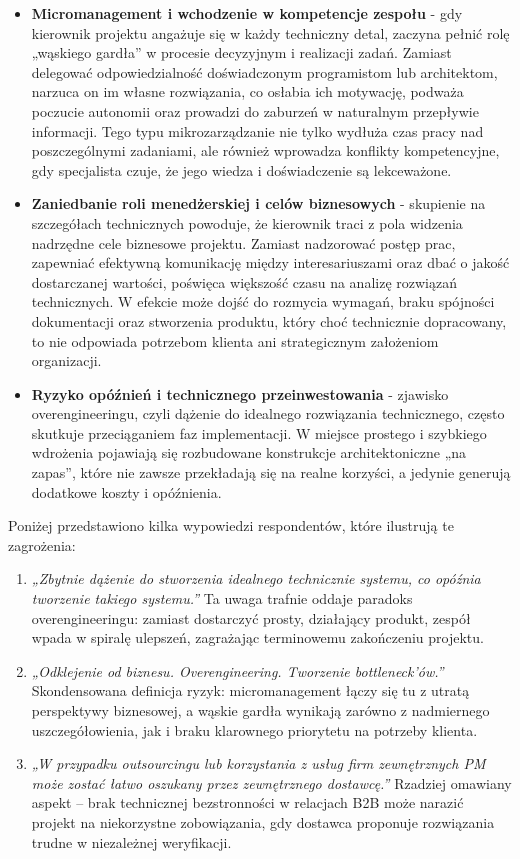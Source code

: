 \begin{itemize}
  \item \textbf{Micromanagement i wchodzenie w kompetencje zespołu} - gdy kierownik projektu angażuje się w każdy techniczny detal, zaczyna pełnić rolę „wąskiego gardła” w procesie decyzyjnym i realizacji zadań. Zamiast delegować odpowiedzialność doświadczonym programistom lub architektom, narzuca on im własne rozwiązania, co osłabia ich motywację, podważa poczucie autonomii oraz prowadzi do zaburzeń w naturalnym przepływie informacji. Tego typu mikrozarządzanie nie tylko wydłuża czas pracy nad poszczególnymi zadaniami, ale również wprowadza konflikty kompetencyjne, gdy specjalista czuje, że jego wiedza i doświadczenie są lekceważone.
  \item \textbf{Zaniedbanie roli menedżerskiej i celów biznesowych} - skupienie na szczegółach technicznych powoduje, że kierownik traci z pola widzenia nadrzędne cele biznesowe projektu. Zamiast nadzorować postęp prac, zapewniać efektywną komunikację między interesariuszami oraz dbać o jakość dostarczanej wartości, poświęca większość czasu na analizę rozwiązań technicznych. W efekcie może dojść do rozmycia wymagań, braku spójności dokumentacji oraz stworzenia produktu, który choć technicznie dopracowany, to nie odpowiada potrzebom klienta ani strategicznym założeniom organizacji.
  \item \textbf{Ryzyko opóźnień i technicznego przeinwestowania} - zjawisko overengineeringu, czyli dążenie do idealnego rozwiązania technicznego\autocite{overengineering}, często skutkuje przeciąganiem faz implementacji. W miejsce prostego i szybkiego wdrożenia pojawiają się rozbudowane konstrukcje architektoniczne „na zapas”, które nie zawsze przekładają się na realne korzyści, a jedynie generują dodatkowe koszty i opóźnienia.
\end{itemize}

Poniżej przedstawiono kilka wypowiedzi respondentów, które ilustrują te zagrożenia:

\begin{enumerate}
  \item \emph{„Zbytnie dążenie do stworzenia idealnego technicznie systemu, co opóźnia tworzenie takiego systemu.”}  
  Ta uwaga trafnie oddaje paradoks overengineeringu: zamiast dostarczyć prosty, działający produkt, zespół wpada w spiralę ulepszeń, zagrażając terminowemu zakończeniu projektu.
  
  \item \emph{„Odklejenie od biznesu. Overengineering. Tworzenie \emph{bottleneck}’ów.”}  
  Skondensowana definicja ryzyk: micromanagement łączy się tu z utratą perspektywy biznesowej, a wąskie gardła wynikają zarówno z nadmiernego uszczegółowienia, jak i braku klarownego priorytetu na potrzeby klienta.
  
  \item \emph{„W przypadku outsourcingu lub korzystania z usług firm zewnętrznych PM może zostać łatwo oszukany przez zewnętrznego dostawcę.”}  
  Rzadziej omawiany aspekt – brak technicznej bezstronności w relacjach B2B może narazić projekt na niekorzystne zobowiązania, gdy dostawca proponuje rozwiązania trudne w niezależnej weryfikacji.
\end{enumerate}


